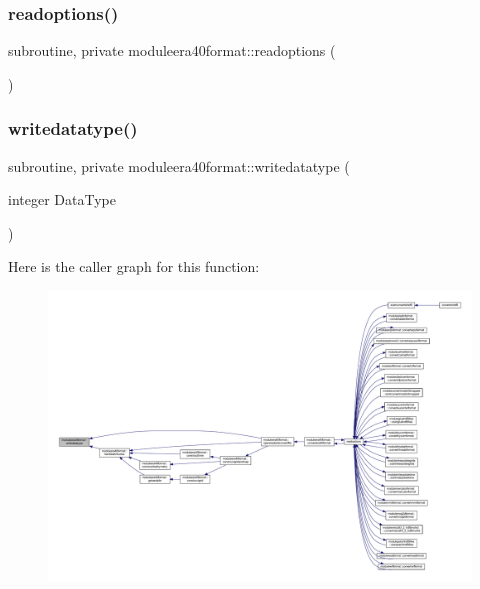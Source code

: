 \subsubsection{\texorpdfstring{readoptions()}{readoptions()}}
{\footnotesize\ttfamily subroutine, private moduleera40format\+::readoptions (\begin{DoxyParamCaption}{ }\end{DoxyParamCaption})\hspace{0.3cm}{\ttfamily [private]}}

\mbox{\label{namespacemoduleera40format_accbbdcac1635a00be7ca33013f811a29}} 
\subsubsection{\texorpdfstring{writedatatype()}{writedatatype()}}
{\footnotesize\ttfamily subroutine, private moduleera40format\+::writedatatype (\begin{DoxyParamCaption}\item[{integer}]{Data\+Type }\end{DoxyParamCaption})\hspace{0.3cm}{\ttfamily [private]}}

Here is the caller graph for this function\+:\nopagebreak
\begin{figure}[H]
\begin{center}
\leavevmode
\includegraphics[width=350pt]{namespacemoduleera40format_accbbdcac1635a00be7ca33013f811a29_icgraph}
\end{center}
\end{figure}
\mbox{\label{namespacemoduleera40format_aeddab9fd7b3d953ed10b899ae10ef9bb}} 
